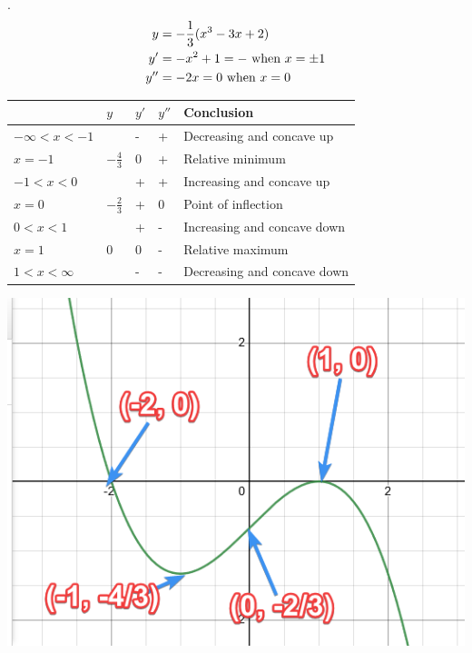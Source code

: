 \documentclass[11pt]{article}
\newcommand*{\vs}{\vspace{1cm}}
\newcommand*{\next}{\noindent}
\newcommand*{\set}{\setcounter{equation}{0}}
\begin{document}
\vs\next
24.\begin{align}
    \set
    y&=-\frac{1}{3}(x^3-3x+2)\\
    y'&=-x^2+1=-\,\,\text{when}\,\, x=\pm 1\\
    y''&=-2x=0\,\,\text{when}\,\, x=0
\end{align}
\begin{flushleft}
    \begin{table}[h]
        \begin{tabular}{|l|l|l|l|l|}
        \hline
         & $y$ & $y'$ & $y''$ & Conclusion\\\hline
         $-\infty<x<-1$ & & - & + & Decreasing and concave up\\\hline
         $x=-1$ & $-\frac{4}{3}$ & 0 & + & Relative minimum\\\hline
         $-1<x<0$ & & + & + & Increasing and concave up\\\hline
         $x=0$ & $-\frac{2}{3}$ & + & 0 & Point of inflection\\\hline
         $0<x<1$ & & + & - & Increasing and concave down\\\hline
         $x=1$ & 0 & 0 & - & Relative maximum\\\hline
         $1<x<\infty$ & & - & - & Decreasing and concave down\\\hline
        \end{tabular}
    \end{table}
\end{flushleft}
\includegraphics{24.png}
\end{document}
